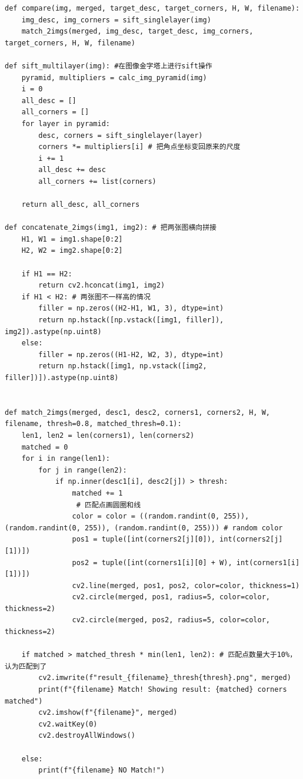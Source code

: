 \documentclass[12pt,a4paper]{article}
\begin{document}
\begin{lstlisting}[style=py]
def compare(img, merged, target_desc, target_corners, H, W, filename):
    img_desc, img_corners = sift_singlelayer(img)
    match_2imgs(merged, img_desc, target_desc, img_corners, target_corners, H, W, filename)
    
def sift_multilayer(img): #在图像金字塔上进行sift操作
    pyramid, multipliers = calc_img_pyramid(img)
    i = 0
    all_desc = []
    all_corners = []
    for layer in pyramid:
        desc, corners = sift_singlelayer(layer)
        corners *= multipliers[i] # 把角点坐标变回原来的尺度
        i += 1
        all_desc += desc
        all_corners += list(corners)
    
    return all_desc, all_corners
    
def concatenate_2imgs(img1, img2): # 把两张图横向拼接
    H1, W1 = img1.shape[0:2]
    H2, W2 = img2.shape[0:2]
    
    if H1 == H2:
        return cv2.hconcat(img1, img2)
    if H1 < H2: # 两张图不一样高的情况
        filler = np.zeros((H2-H1, W1, 3), dtype=int)
        return np.hstack([np.vstack([img1, filler]), img2]).astype(np.uint8)
    else:
        filler = np.zeros((H1-H2, W2, 3), dtype=int)
        return np.hstack([img1, np.vstack([img2, filler])]).astype(np.uint8)


def match_2imgs(merged, desc1, desc2, corners1, corners2, H, W, filename, thresh=0.8, matched_thresh=0.1):
    len1, len2 = len(corners1), len(corners2)
    matched = 0
    for i in range(len1):
        for j in range(len2):
            if np.inner(desc1[i], desc2[j]) > thresh:
                matched += 1
                 # 匹配点画圆圈和线
                color = color = ((random.randint(0, 255)), (random.randint(0, 255)), (random.randint(0, 255))) # random color
                pos1 = tuple([int(corners2[j][0]), int(corners2[j][1])])
                pos2 = tuple([int(corners1[i][0] + W), int(corners1[i][1])])
                cv2.line(merged, pos1, pos2, color=color, thickness=1)
                cv2.circle(merged, pos1, radius=5, color=color, thickness=2)
                cv2.circle(merged, pos2, radius=5, color=color, thickness=2)
    
    if matched > matched_thresh * min(len1, len2): # 匹配点数量大于10%，认为匹配到了
        cv2.imwrite(f"result_{filename}_thresh{thresh}.png", merged)
        print(f"{filename} Match! Showing result: {matched} corners matched")
        cv2.imshow(f"{filename}", merged)
        cv2.waitKey(0)
        cv2.destroyAllWindows()

    else:
        print(f"{filename} NO Match!")



\end{lstlisting}
\end{document}
